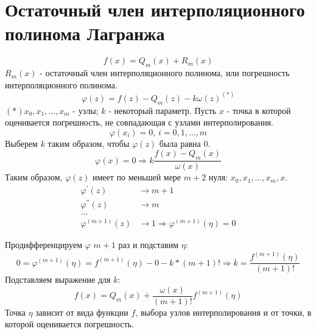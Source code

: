 \documentclass[a4paper,11pt]{article}
\begin{document}
\section{Остаточный член интерполяционного полинома Лагранжа}
\[f(x) = Q_m(x) + R_m(x)\]
\(R_m(x)\) - остаточный член интерполяционного полинома, или погрешность интерполяционного полинома.
\[\varphi(z) = f(z) - Q_m(z) - k\omega(z)^{(*)}\]
\marginpar
{
  \footnotesize \((*)x_0, x_1, \dots, x_m\) - узлы; $k$ - некоторый параметр.
}
Пусть $x$ - точка в которой оценивается погрешность, не совпадающая с узлами интерполирования.
\[\varphi(x_i) = 0, \, i = 0, 1, \dots, m\]
Выберем $k$ таким образом, чтобы $\varphi(z)$ была равна $0$.
\[\varphi(x) = 0 \Rightarrow k \frac{f(x) - Q_m(x)}{\omega(x)}\]
Таким образом, $\varphi(z)$ имеет по меньшей мере $m+2$ нуля: $x_0, x_1, \dots, x_m, x$. \\
\begin{align*}
  \varphi^{'}(z) & \rightarrow m + 1 \\
  \varphi^{''}(z) & \rightarrow m \\
  \dots \\
  \varphi^{(m + 1)}(z) & \rightarrow 1 \Rightarrow \varphi^{(m + 1)}(\eta) = 0
\end{align*}

Продифференцируем $\varphi$ $m+1$ раз и подставим $\eta$:
\[0 = \varphi^{(m+1)}(\eta) = f^{(m+1)}(\eta) - 0 - k * (m + 1)! \Rightarrow k = \frac{f^{(m+1)}(\eta)}{(m+1)!}\]
Подставляем выражение для $k$:
\[f(x) = Q_m(x) + \frac{\omega(x)}{(m+1)!}f^{(m+1)}(\eta)\]
Точка $\eta$ зависит от вида функции $f$, выбора узлов интерполирования и от точки, в которой оценивается погрешность.
\end{document}
